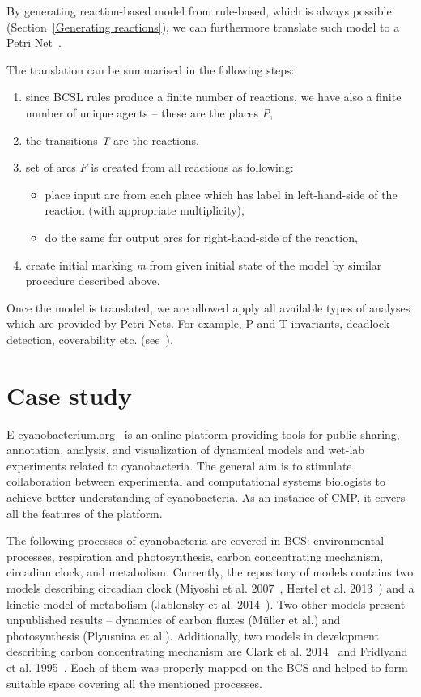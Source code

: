 \documentclass[12pt]{fithesis2}
\begin{document}
By generating reaction-based model from rule-based, which is always possible (Section~\ref{Generating reactions}), we can furthermore translate such model to a Petri Net~\cite{petri}.

The translation can be summarised in the following steps: 

\begin{enumerate}
\item since BCSL rules produce a finite number of reactions, we have also a finite number of unique agents -- these are the places \emph{P},
\item the transitions \emph{T} are the reactions,
\item set of arcs $F$ is created from all reactions as following:
\begin{itemize}
  \item place input arc from each place which has label in left-hand-side of the reaction (with appropriate multiplicity),
  \item do the same for output arcs for right-hand-side of the reaction,
\end{itemize}
\item create initial marking \emph{m} from given initial state of the model by similar procedure described above.
\end{enumerate}

Once the model is translated, we are allowed apply all available types of analyses which are provided by Petri Nets. For example, P and T invariants, deadlock detection, coverability etc. (see~\cite{petri}).

\chapter{Case study}
\label{case_study}

E-cyanobacterium.org~\cite{Trojak2016} is an online platform providing tools for public sharing, annotation, analysis, and visualization of dynamical models and wet-lab experiments related to cyanobacteria. The general aim is to stimulate collaboration between experimental and computational systems biologists to achieve better understanding of cyanobacteria. As an instance of CMP, it covers all the features of the platform.

The following processes of cyanobacteria are covered in BCS: environmental processes, respiration and photosynthesis, carbon concentrating mechanism, circadian clock, and metabolism. Currently, the repository of models contains two models describing circadian clock (Miyoshi et al. 2007~\cite{Miyoshi01022007}, Hertel et al. 2013~\cite{Hertel2013}) and a kinetic model of metabolism (Jablonsky et al. 2014~\cite{Jablonsky2014}). Two other models present unpublished results -- dynamics of carbon fluxes (M\"{u}ller et al.) and photosynthesis (Plyusnina et al.). Additionally, two models in development describing carbon concentrating mechanism are Clark et al. 2014~\cite{clark2014insights} and Fridlyand et al. 1995~\cite{fridlyand1996quantitative}. Each of them was properly mapped on the BCS and helped to form suitable space covering all the mentioned processes.
\end{document}
